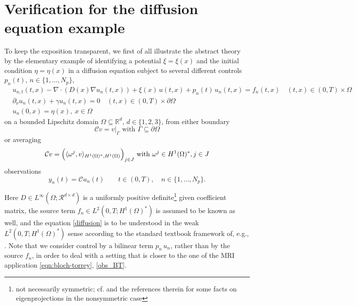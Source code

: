 \documentclass[12pt]{article}
\newcommand\coilsens{\omega}
\newcommand\pot{\xi}
\newcommand\init{\eta}
\newcommand\contr{p}
\newcommand\Ncont{N_p}
\begin{document}
\section{Verification for the diffusion equation example}\label{sec:diffusion}
To keep the exposition transparent, we 
first of all
illustrate the abstract theory by the elementary example of identifying a potential $\pot=\pot(x)$ 
and the initial condition $\init=\init(x)$ 
in a diffusion equation subject to several different controls $\contr_n(t)$, 
$n\in\{1,\ldots,\Ncont\}$,
\begin{equation}\label{diffusion}
\begin{aligned}
&u_{n,t}(t,x)-\nabla\cdot (D(x)\nabla u_n(t,x))+\pot(x)\,u(t,x)+\contr_n(t)\,u_n(t,x)=f_n(t,x) \quad (t,x)\in (0,T)\times\Omega\\
&\partial_\nu u_n(t,x)+\gamma u_n(t,x)=0  \quad (t,x)\in (0,T)\times\partial\Omega\\ 
&u_n(0,x)=\init(x), \ x\in \Omega
\end{aligned}
\end{equation}
on a bounded Lipschitz domain $\Omega\subseteq\mathbb{R}^d$, $d\in\{1,2,3\}$,
from either boundary
\begin{equation}\label{C_bndy}
\mathcal{C}v=v\vert_\Gamma \text{ with }\Gamma\subseteq\partial\Omega
\end{equation}
or averaging 
\begin{equation}\label{C_avrg}
\mathcal{C}v=\Bigl(\langle \coilsens^j,v\rangle_{H^1(\Omega)^*,H^1(\Omega)}\Bigr)_{j\in J} \text{ with }\coilsens^j\in H^1(\Omega)^*, j\in J
\end{equation}
observations
\begin{equation}\label{obs_n}
y_n(t)=\mathcal{C}u_n(t)  \qquad t\in(0,T), \quad n\in\{1,\ldots,\Ncont\}.
\end{equation}


Here 
$D\in L^\infty(\Omega;\mathcal{R}^{d\times d})$ is a uniformly positive definite\footnote{not necessarily symmetric; cf. \cite{JiangLiPauronYamamoto2023} and the references therein for some facts on eigenprojections in the nonsymmetric case} 
given coefficient matrix, the source term $f_n\in L^2(0,T;H^1(\Omega)^*)$ is assumed to be known as well, and the equation \eqref{diffusion} is to be understood in the weak $L^2(0,T;H^1(\Omega)^*)$ sense according to the standard textbook framework of, e.g., \cite{EvansBook}. 
Note that we consider control by a bilinear term $p_n\,u_n$, rather than by the source $f_n$, in order to deal with a setting that is closer to the one of the MRI application \eqref{eqn:bloch-torrey}, \eqref{obs_BT}.
\end{document}
